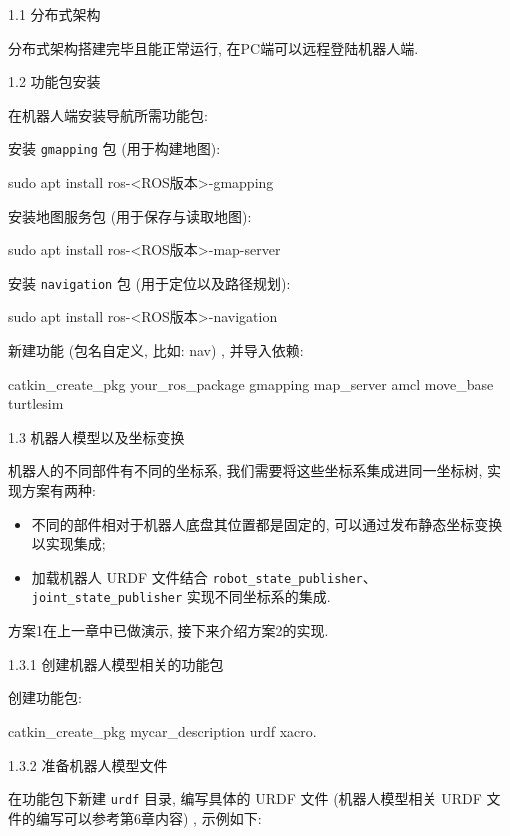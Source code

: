 \documentclass[openany, fontset=windowsold]{ctexbook}
\theoremstyle{kaiti}
\theoremstyle{normal}
\begin{document}
1.1 分布式架构

分布式架构搭建完毕且能正常运行, 在PC端可以远程登陆机器人端.

1.2 功能包安装

在机器人端安装导航所需功能包: 

安装 \verb|gmapping| 包 (用于构建地图):

\begin{bash}
  sudo apt install ros-<ROS版本>-gmapping
\end{bash}

安装地图服务包 (用于保存与读取地图):

\begin{bash}
  sudo apt install ros-<ROS版本>-map-server
\end{bash}

安装 \verb|navigation| 包 (用于定位以及路径规划):

\begin{bash}
  sudo apt install ros-<ROS版本>-navigation
\end{bash}

新建功能 (包名自定义, 比如: nav) , 并导入依赖:

\begin{bash}
  catkin_create_pkg your_ros_package gmapping map_server amcl move_base turtlesim
\end{bash}

1.3 机器人模型以及坐标变换

机器人的不同部件有不同的坐标系, 我们需要将这些坐标系集成进同一坐标树, 实现方案有两种: 

\begin{itemize}
  \item 不同的部件相对于机器人底盘其位置都是固定的, 可以通过发布静态坐标变换以实现集成; 
  \item 加载机器人 URDF 文件结合 \verb|robot_state_publisher|、\verb|joint_state_publisher| 实现不同坐标系的集成.
\end{itemize}

方案1在上一章中已做演示, 接下来介绍方案2的实现.

1.3.1 创建机器人模型相关的功能包

创建功能包:

\begin{bash}
  catkin_create_pkg mycar_description urdf xacro.
\end{bash}

1.3.2 准备机器人模型文件

在功能包下新建 \verb|urdf| 目录, 编写具体的 URDF 文件 (机器人模型相关 URDF 文件的编写可以参考第6章内容) , 示例如下: 
\end{document}
